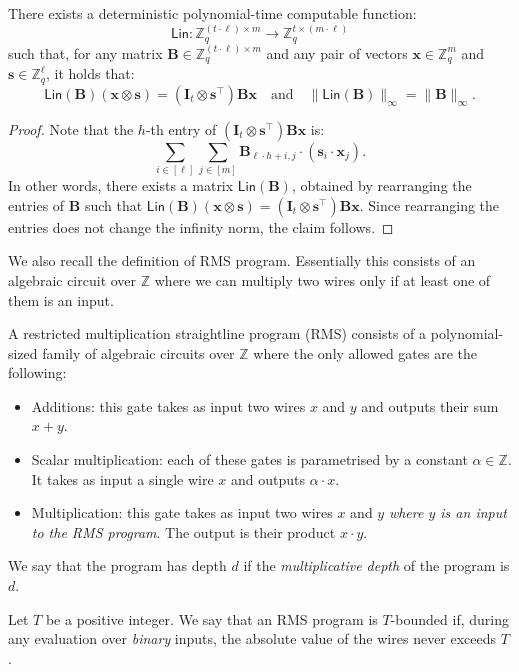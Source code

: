 \documentclass{theoretics}
\newcommand{\Z}{\mathbb{Z}}
\newcommand{\id}{\ensuremath{\mathbf{I}}}
\newcommand{\thmlab}[1]{\label{thm:#1}}
\begin{document}
\begin{lemma}
\thmlab{linearisation}
    There exists a deterministic polynomial-time computable function:
    \[
    \mathsf{Lin} : \Z_q^{(t\cdot \ell)\times m} \to \Z_q^{t\times (m\cdot \ell)}
    \]
    such that, for any matrix 
    $\mathbf{B}\in \Z_q^{(t\cdot \ell)\times m}$ and any pair of vectors $\mathbf{x}\in\Z_q^{m}$ and $\mathbf{s}\in\Z_q^\ell$, it holds that:
    \[
    \mathsf{Lin}(\mathbf{B})(\mathbf{x}\otimes \mathbf{s})=(\id_t\otimes \mathbf{s}^\intercal) \mathbf{B}\mathbf{x} \quad\text{and}\quad \|\mathsf{Lin}(\mathbf{B})\|_\infty = \|\mathbf{B}\|_\infty.
    \]
    \end{lemma}
\begin{proof}
Note that the $h$-th entry of $(\id_t\otimes \mathbf{s}^\intercal) \mathbf{B} \mathbf{x}$ is: 
\[\sum_{i\in[\ell]}\sum_{j\in[m]} \mathbf{B}_{\ell\cdot h+i, j} \cdot (\mathbf{s}_{i}\cdot \mathbf{x}_{j}).\]
In other words, there exists a matrix $\mathsf{Lin}(\mathbf{B})$, obtained by rearranging the entries of $\mathbf{B}$ such that $\mathsf{Lin}(\mathbf{B}) (\mathbf{x}\otimes \mathbf{s})=(\id_t\otimes \mathbf{s}^\intercal) \mathbf{B} \mathbf{x}$. Since rearranging the entries does not change the infinity norm, the claim follows.
\end{proof}

We also recall the definition of RMS program. Essentially this consists of an algebraic circuit over $\Z$ where we can multiply two wires only if at least one of them is an input.

\begin{definition}
A restricted multiplication straightline program (RMS) consists of a polynomial-sized family of algebraic circuits over $\Z$ where the only allowed gates are the following:
\begin{itemize}
    \item Additions: this gate takes as input two wires $x$ and $y$ and outputs their sum $x+y$.
    \item Scalar multiplication: each of these gates is parametrised by a constant $\alpha\in\Z$. It takes as input a single wire $x$ and outputs $\alpha\cdot x$.
    \item Multiplication: this gate takes as input two wires $x$ and $y$ \emph{where $y$ is an input to the RMS program}. The output is their product $x\cdot y$.
\end{itemize}
We say that the program has depth $d$ if the \emph{multiplicative depth} of the program is $d$.

Let $T$ be a positive integer. We say that an RMS program is $T$-bounded if, during any evaluation over \emph{binary} inputs, the absolute value of the wires never exceeds $T$.
\end{definition}
\end{document}
